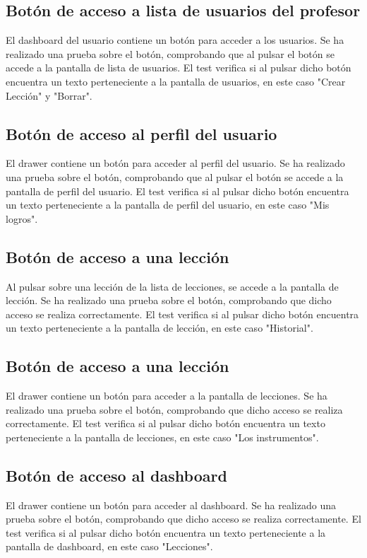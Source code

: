 \subsection{Botón de acceso a lista de usuarios del profesor}
\label{subsec:pruebas-controlador-boton-usuarios}
El dashboard del usuario contiene un botón para acceder a los usuarios. Se ha realizado una prueba sobre el botón, comprobando que al pulsar el botón se accede a la pantalla de lista de usuarios. 
El test verifica si al pulsar dicho botón encuentra un texto perteneciente a la pantalla de usuarios, en este caso "Crear Lección" y "Borrar".

\subsection{Botón de acceso al perfil del usuario}
\label{subsec:pruebas-controlador-boton-perfil-usuario}
El drawer contiene un botón para acceder al perfil del usuario. Se ha realizado una prueba sobre el botón, comprobando que al pulsar el botón se accede a la pantalla de perfil del usuario.
El test verifica si al pulsar dicho botón encuentra un texto perteneciente a la pantalla de perfil del usuario, en este caso "Mis logros".

\subsection{Botón de acceso a una lección}
\label{subsec:pruebas-controlador-boton-leccion}
Al pulsar sobre una lección de la lista de lecciones, se accede a la pantalla de lección. Se ha realizado una prueba sobre el botón, comprobando que dicho acceso se realiza correctamente.
El test verifica si al pulsar dicho botón encuentra un texto perteneciente a la pantalla de lección, en este caso "Historial".

\subsection{Botón de acceso a una lección}
\label{subsec:pruebas-controlador-boton-leccion}
El drawer contiene un botón para acceder a la pantalla de lecciones. Se ha realizado una prueba sobre el botón, comprobando que dicho acceso se realiza correctamente.
El test verifica si al pulsar dicho botón encuentra un texto perteneciente a la pantalla de lecciones, en este caso "Los instrumentos".

\subsection{Botón de acceso al dashboard}
\label{subsec:pruebas-controlador-boton-leccion}
El drawer contiene un botón para acceder al dashboard. Se ha realizado una prueba sobre el botón, comprobando que dicho acceso se realiza correctamente.
El test verifica si al pulsar dicho botón encuentra un texto perteneciente a la pantalla de dashboard, en este caso "Lecciones".

